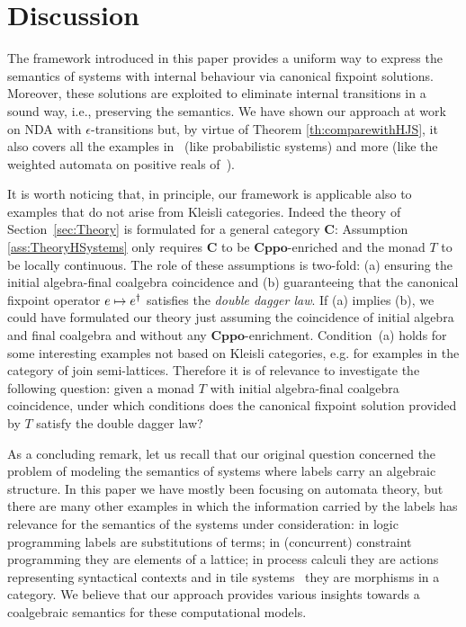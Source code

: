 \documentclass[oribibl,envcountsame,envcountsect,runningheads]{llncs}
\newcommand{\cat}[1]{\ensuremath{\mathbf{#1}}}
\newcommand{\cppo}{\cat{Cppo}}
\renewcommand{\>}{\rangle}
\begin{document}
\section{Discussion}\label{Sec:Discussion}
The framework introduced in this paper provides a uniform way to express the semantics of systems with internal behaviour via canonical fixpoint solutions. Moreover, these solutions are exploited to eliminate internal transitions in a sound way, i.e., preserving the semantics. We have shown our approach at work on NDA with $\epsilon$-transitions but, by virtue of Theorem \ref{th:comparewithHJS}, it also covers all the examples in~\cite{HasuoJS:07} (like probabilistic systems) and more (like the weighted automata on positive reals of~\cite{SW13}).

It is worth noticing that, in principle, our framework is applicable also to examples that do not arise from Kleisli categories. Indeed the theory of Section~\ref{sec:Theory} is formulated for a general category $\cat{C}$: Assumption \ref{ass:TheoryHSystems} only requires $\cat{C}$ to be $\cppo$-enriched and the monad $T$ to be locally continuous. The role of these assumptions is two-fold: (a) ensuring the initial algebra-final coalgebra coincidence and (b) guaranteeing that the canonical fixpoint operator $e \mapsto {e}^\dag$ satisfies the \emph{double dagger law}. If (a) implies (b), we could have formulated our theory just assuming the coincidence of initial algebra and final coalgebra and without any $\cppo$-enrichment. Condition~(a) holds for some interesting examples not based on Kleisli categories, e.g. for examples in the category of join semi-lattices. Therefore it is of relevance to investigate the following question: given a monad $T$ with initial algebra-final coalgebra coincidence, under which conditions does the canonical fixpoint solution provided by $T$ satisfy the double dagger law?

As a concluding remark, let us recall that our original question concerned the problem of modeling the semantics of systems where labels carry an algebraic structure.
In this paper we have mostly been focusing on automata theory, but there are many other examples in which the information carried by the labels has relevance for the semantics of the systems under consideration:
in logic programming labels are substitutions of terms; in (concurrent) constraint programming they are elements of a lattice; in process calculi they are actions representing syntactical contexts and in tile systems~\cite{DBLP:conf/birthday/GadducciM00} they are morphisms in a category. We believe that our approach provides various insights towards a coalgebraic semantics for these computational models.
\end{document}
